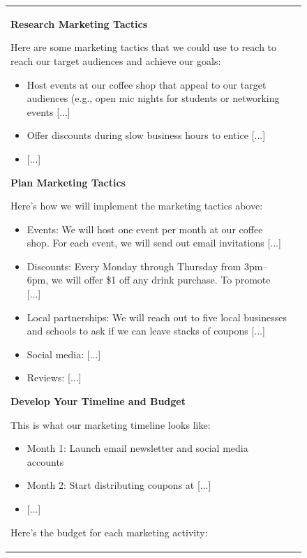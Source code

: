 \documentclass{article}
\begin{document}
\begin{figure}[p]
\begin{tabular}{@{}p{}p{}@{}}
    \textbf{Research Marketing Tactics}

    Here are some marketing tactics that we could use to reach to reach our target audiences and achieve our goals:
    \begin{itemize}[leftmargin=8pt]
        \item Host events at our coffee shop that appeal to our target audiences (e.g., open mic nights for students or networking events \textcolor[HTML]{808080}{[...]}
        \item Offer discounts during slow business hours to entice \textcolor[HTML]{808080}{[...]}
        \item \textcolor[HTML]{808080}{[...]}
    \end{itemize}
    
    \textbf{Plan Marketing Tactics}
    
    Here's how we will implement the marketing tactics above:

    \begin{itemize}[leftmargin=8pt]
    \item Events: We will host one event per month at our coffee shop. For each event, we will send out email invitations \textcolor[HTML]{808080}{[...]}
    \item Discounts: Every Monday through Thursday from 3pm–6pm, we will offer \$1 off any drink purchase. To promote \textcolor[HTML]{808080}{[...]}
    \item Local partnerships: We will reach out to five local businesses and schools to ask if we can leave stacks of coupons \textcolor[HTML]{808080}{[...]}
    \item Social media: \textcolor[HTML]{808080}{[...]}
    \item Reviews: \textcolor[HTML]{808080}{[...]}
    \end{itemize}
    
    \textbf{Develop Your Timeline and Budget}

    This is what our marketing timeline looks like:
    \begin{itemize}[leftmargin=8pt]
        \item Month 1: Launch email newsletter and social media accounts
        \item Month 2: Start distributing coupons at \textcolor[HTML]{808080}{[...]}
        \item \textcolor[HTML]{808080}{[...]}
    \end{itemize}

    Here's the budget for each marketing activity:


\end{tabular}
\end{figure}
\end{document}
